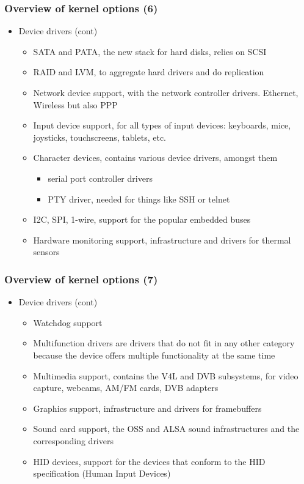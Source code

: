 \begin{frame}
  \frametitle{Overview of kernel options (6)}
  \begin{itemize}
  \item Device drivers (cont)
    \begin{itemize}
    \item SATA and PATA, the new stack for hard disks, relies on SCSI
    \item RAID and LVM, to aggregate hard drivers and do replication
    \item Network device support, with the network controller
      drivers. Ethernet, Wireless but also PPP
    \item Input device support, for all types of input devices:
      keyboards, mice, joysticks, touchscreens, tablets, etc.
    \item Character devices, contains various device drivers, amongst
      them
      \begin{itemize}
      \item serial port controller drivers
      \item PTY driver, needed for things like SSH or telnet
      \end{itemize}
    \item I2C, SPI, 1-wire, support for the popular embedded buses
    \item Hardware monitoring support, infrastructure and drivers for
      thermal sensors
    \end{itemize}
  \end{itemize}
\end{frame}

\begin{frame}
  \frametitle{Overview of kernel options (7)}
  \begin{itemize}
  \item Device drivers (cont)
    \begin{itemize}
    \item Watchdog support
    \item Multifunction drivers are drivers that do not fit in any
      other category because the device offers multiple functionality
      at the same time
    \item Multimedia support, contains the V4L and DVB subsystems, for
      video capture, webcams, AM/FM cards, DVB adapters
    \item Graphics support, infrastructure and drivers for
      framebuffers
    \item Sound card support, the OSS and ALSA sound infrastructures
      and the corresponding drivers
    \item HID devices, support for the devices that conform to the HID
      specification (Human Input Devices)
    \end{itemize}
  \end{itemize}
\end{frame}

